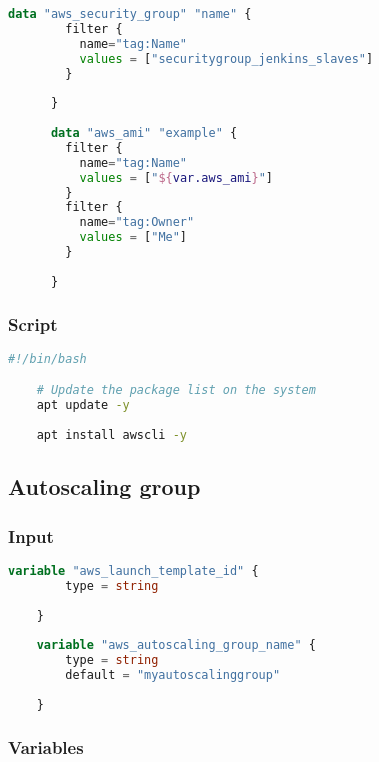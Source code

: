 \begin{lstlisting}[language=terraform]
    data "aws_security_group" "name" {
        filter {
          name="tag:Name"
          values = ["securitygroup_jenkins_slaves"]
        }
        
      }
      
      data "aws_ami" "example" {
        filter {
          name="tag:Name"
          values = ["${var.aws_ami}"]
        }
        filter {
          name="tag:Owner"
          values = ["Me"]
        }
        
      }
\end{lstlisting}

\subsubsection{
{Script}}

\begin{lstlisting}[language=bash, style=bashstyle]
    #!/bin/bash

    # Update the package list on the system
    apt update -y
    
    apt install awscli -y
\end{lstlisting}

\subsection{
{Autoscaling group}}
\label{sec:Autoscaling group}

\subsubsection{
{Input}}

\begin{lstlisting}[language=terraform]
    variable "aws_launch_template_id" {
        type = string
        
    }
    
    variable "aws_autoscaling_group_name" {
        type = string
        default = "myautoscalinggroup"
      
    }
\end{lstlisting}


\subsubsection{
{Variables}}


